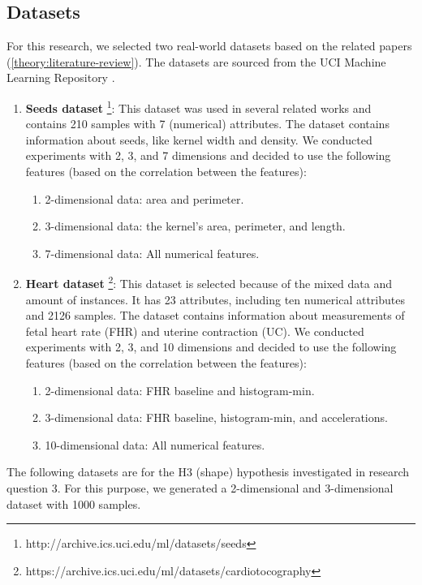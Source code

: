 \subsection{Datasets} \label{datasets-section}
For this research, we selected two real-world datasets based on the related papers (\ref{theory:literature-review}).
The datasets are sourced from the UCI Machine Learning Repository \citep{noauthor_uci_nodate}.
\begin{enumerate}
  \item \textbf{Seeds dataset} \footnote{http://archive.ics.uci.edu/ml/datasets/seeds}: This dataset was used in several related works and contains 210 samples with 7 (numerical) attributes.
        The dataset contains information about seeds, like kernel width and density.
        We conducted experiments with 2, 3, and 7 dimensions and decided to use the following features (based on the correlation between the features):
        \begin{enumerate}
          \item 2-dimensional data: area and perimeter.
          \item 3-dimensional data: the kernel's area, perimeter, and length.
          \item 7-dimensional data: All numerical features.
        \end{enumerate}
  \item \textbf{Heart dataset} \footnote{https://archive.ics.uci.edu/ml/datasets/cardiotocography}: This dataset is selected because of the mixed data and amount of instances.
        It has 23 attributes, including ten numerical attributes and 2126 samples.
        The dataset contains information about measurements of fetal heart rate (FHR) and uterine contraction (UC).
        We conducted experiments with 2, 3, and 10 dimensions and decided to use the following features (based on the correlation between the features):
        \begin{enumerate}
          \item 2-dimensional data: FHR baseline and histogram-min.
          \item 3-dimensional data: FHR baseline, histogram-min, and accelerations.
          \item 10-dimensional data: All numerical features.
        \end{enumerate}
\end{enumerate}
The following datasets are for the H3 (shape) hypothesis investigated in research question 3.
For this purpose, we generated a 2-dimensional and 3-dimensional dataset with 1000 samples.
